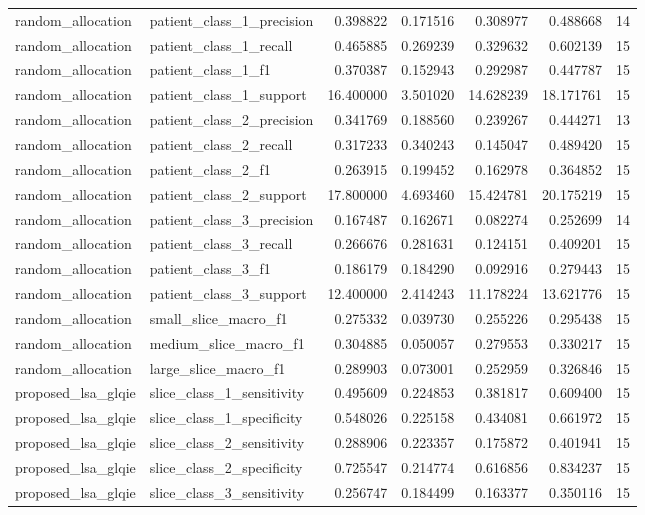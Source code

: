 \begin{tabular}{llrrrrr}
random_allocation & patient_class_1_precision & 0.398822 & 0.171516 & 0.308977 & 0.488668 & 14 \\
random_allocation & patient_class_1_recall & 0.465885 & 0.269239 & 0.329632 & 0.602139 & 15 \\
random_allocation & patient_class_1_f1 & 0.370387 & 0.152943 & 0.292987 & 0.447787 & 15 \\
random_allocation & patient_class_1_support & 16.400000 & 3.501020 & 14.628239 & 18.171761 & 15 \\
random_allocation & patient_class_2_precision & 0.341769 & 0.188560 & 0.239267 & 0.444271 & 13 \\
random_allocation & patient_class_2_recall & 0.317233 & 0.340243 & 0.145047 & 0.489420 & 15 \\
random_allocation & patient_class_2_f1 & 0.263915 & 0.199452 & 0.162978 & 0.364852 & 15 \\
random_allocation & patient_class_2_support & 17.800000 & 4.693460 & 15.424781 & 20.175219 & 15 \\
random_allocation & patient_class_3_precision & 0.167487 & 0.162671 & 0.082274 & 0.252699 & 14 \\
random_allocation & patient_class_3_recall & 0.266676 & 0.281631 & 0.124151 & 0.409201 & 15 \\
random_allocation & patient_class_3_f1 & 0.186179 & 0.184290 & 0.092916 & 0.279443 & 15 \\
random_allocation & patient_class_3_support & 12.400000 & 2.414243 & 11.178224 & 13.621776 & 15 \\
random_allocation & small_slice_macro_f1 & 0.275332 & 0.039730 & 0.255226 & 0.295438 & 15 \\
random_allocation & medium_slice_macro_f1 & 0.304885 & 0.050057 & 0.279553 & 0.330217 & 15 \\
random_allocation & large_slice_macro_f1 & 0.289903 & 0.073001 & 0.252959 & 0.326846 & 15 \\
proposed_lsa_glqie & slice_class_1_sensitivity & 0.495609 & 0.224853 & 0.381817 & 0.609400 & 15 \\
proposed_lsa_glqie & slice_class_1_specificity & 0.548026 & 0.225158 & 0.434081 & 0.661972 & 15 \\
proposed_lsa_glqie & slice_class_2_sensitivity & 0.288906 & 0.223357 & 0.175872 & 0.401941 & 15 \\
proposed_lsa_glqie & slice_class_2_specificity & 0.725547 & 0.214774 & 0.616856 & 0.834237 & 15 \\
proposed_lsa_glqie & slice_class_3_sensitivity & 0.256747 & 0.184499 & 0.163377 & 0.350116 & 15 \\

\end{tabular}
